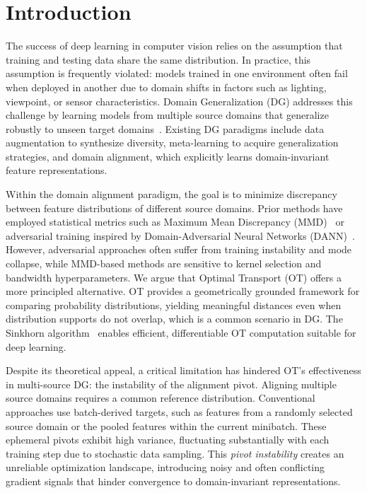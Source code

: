 \section{Introduction}
\label{sec:introduction}

The success of deep learning in computer vision relies on the assumption that training and testing data share the same distribution. In practice, this assumption is frequently violated: models trained in one environment often fail when deployed in another due to domain shifts in factors such as lighting, viewpoint, or sensor characteristics. Domain Generalization (DG) addresses this challenge by learning models from multiple source domains that generalize robustly to unseen target domains~\citep{zhou2022domain}. Existing DG paradigms include data augmentation to synthesize diversity, meta-learning to acquire generalization strategies, and domain alignment, which explicitly learns domain-invariant feature representations.

Within the domain alignment paradigm, the goal is to minimize discrepancy between feature distributions of different source domains. Prior methods have employed statistical metrics such as Maximum Mean Discrepancy (MMD)~\citep{li2018domain_mmd} or adversarial training inspired by Domain-Adversarial Neural Networks (DANN)~\citep{ganin2016domain}. However, adversarial approaches often suffer from training instability and mode collapse, while MMD-based methods are sensitive to kernel selection and bandwidth hyperparameters. We argue that Optimal Transport (OT) offers a more principled alternative. OT provides a geometrically grounded framework for comparing probability distributions, yielding meaningful distances even when distribution supports do not overlap, which is a common scenario in DG. The Sinkhorn algorithm~\citep{cuturi2013sinkhorn} enables efficient, differentiable OT computation suitable for deep learning.

Despite its theoretical appeal, a critical limitation has hindered OT's effectiveness in multi-source DG: the instability of the alignment pivot. Aligning multiple source domains requires a common reference distribution. Conventional approaches use batch-derived targets, such as features from a randomly selected source domain or the pooled features within the current minibatch. These ephemeral pivots exhibit high variance, fluctuating substantially with each training step due to stochastic data sampling. This \textit{pivot instability} creates an unreliable optimization landscape, introducing noisy and often conflicting gradient signals that hinder convergence to domain-invariant representations.

